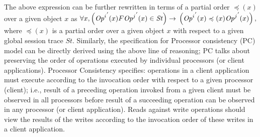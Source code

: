 \documentclass{sig-alternate-05-2015}
\begin{document}
The above expression can be further rewritten in terms of a partial order $ \preccurlyeq(x)$ over a given object $x$ as $\forall x, \left( {\mathit{Op}^i}^{'}(x) F {\mathit{Op}^j}^{'} (x) \in \mathit{St} \right) \rightarrow \\ \left( {\mathit{Op}^i}^{'}(x) \preccurlyeq(x) {\mathit{Op}^j}^{'} (x) \right),$
   where $ \preccurlyeq(x)$ is a partial order over a given object $x$ with respect to a given global session trace $ \mathit{St}$.
 Similarly, the specification for Processor consistency (PC) model can be directly derived using the above line of reasoning;
 PC talks about preserving the order of operations executed by individual processors (or client applications).  Processor Consistency specifies: operations in a client application must execute according to the invocation order with respect to a given processor (client); i.e., result of a preceding operation invoked from a given client must be observed in all processors before result of a
 succeeding operation can be observed in any processor (or client application). Reads against  write operations should
  view the results of the writes
  according to the invocation order of these writes in a client application. %
\end{document}
